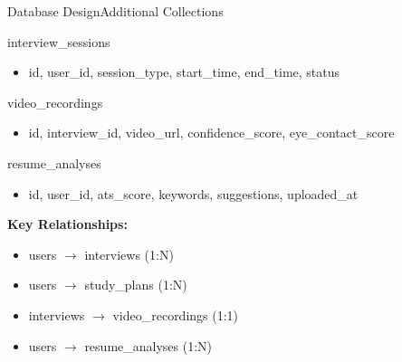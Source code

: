 \documentclass{beamer}
\begin{document}
\begin{frame}{Database Design}{Additional Collections}
\begin{block}{interview\_sessions}
\begin{itemize}
    \item id, user\_id, session\_type, start\_time, end\_time, status
\end{itemize}
\end{block}

\begin{block}{video\_recordings}
\begin{itemize}
    \item id, interview\_id, video\_url, confidence\_score, eye\_contact\_score
\end{itemize}
\end{block}

\begin{block}{resume\_analyses}
\begin{itemize}
    \item id, user\_id, ats\_score, keywords, suggestions, uploaded\_at
\end{itemize}
\end{block}

\vspace{3pt}
\textbf{Key Relationships:}
\begin{itemize}
    \item users $\rightarrow$ interviews (1:N)
    \item users $\rightarrow$ study\_plans (1:N)
    \item interviews $\rightarrow$ video\_recordings (1:1)
    \item users $\rightarrow$ resume\_analyses (1:N)
\end{itemize}
\end{frame}

\end{document}
